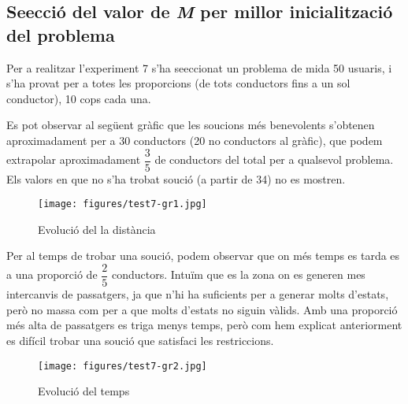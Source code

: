 \subsection{Se\lgem ecció del valor de \emph{M} per millor inicialització del problema}
Per a realitzar l'experiment 7 s'ha se\lgem eccionat un problema de mida 50 usuaris, i s'ha provat per a totes les proporcions
(de tots conductors fins a un sol conductor), 10 cops cada una.

Es pot observar al següent gràfic que les so\lgem ucions més benevolents s'obtenen aproximadament per a 30 conductors (20 no conductors al gràfic),
que podem extrapolar aproximadament $\dfrac{3}{5}$ de conductors del total per a qualsevol problema.
Els valors en que no s'ha trobat so\lgem ució (a partir de 34) no es mostren.

\begin{figure}[H]
\begin{center}
 \texttt{[image: figures/test7-gr1.jpg]}
 \label{test7-gr2}
\end{center}
\caption{Evolució del la distància}
\end{figure}

Per al temps de trobar una so\lgem ució, podem observar que on més temps es tarda es a una proporció de $\dfrac{2}{5}$ conductors.
Intuïm que es la zona on es generen mes intercanvis de passatgers, ja que n'hi ha suficients per a generar molts d'estats,
però no massa com per a que molts d'estats no siguin vàlids.
Amb una proporció més alta de passatgers es triga menys temps, però com hem explicat anteriorment es difícil trobar una so\lgem ució que satisfaci les restriccions.

\begin{figure}[H]
\begin{center}
 \texttt{[image: figures/test7-gr2.jpg]}
 \label{test7-gr2}
\end{center}
\caption{Evolució del temps}
\end{figure}
        
